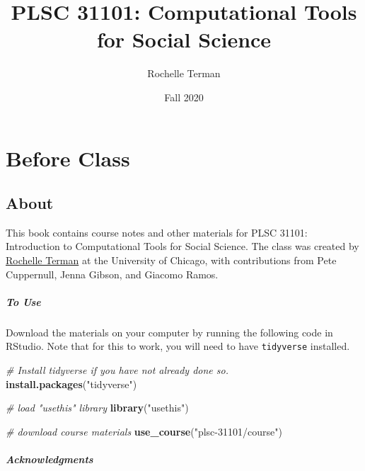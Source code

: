 \documentclass[
]{book}
\title{PLSC 31101: Computational Tools for Social Science}
\author{Rochelle Terman}
\date{Fall 2020}
\newenvironment{Shaded}{\begin{snugshade}}{\end{snugshade}}
\newcommand{\CommentTok}[1]{\textcolor[rgb]{0.56,0.35,0.01}{\textit{#1}}}
\newcommand{\KeywordTok}[1]{\textcolor[rgb]{0.13,0.29,0.53}{\textbf{#1}}}
\newcommand{\NormalTok}[1]{#1}
\newcommand{\StringTok}[1]{\textcolor[rgb]{0.31,0.60,0.02}{#1}}
\begin{document}
\maketitle

{
\setcounter{tocdepth}{1}
\tableofcontents
}
\hypertarget{part-before-class}{%
\part{Before Class}\label{part-before-class}}

\hypertarget{about}{%
\chapter{About}\label{about}}

This book contains course notes and other materials for PLSC 31101: Introduction to Computational Tools for Social Science. The class was created by \href{http://rochelleterman.com/}{Rochelle Terman} at the University of Chicago, with contributions from Pete Cuppernull, Jenna Gibson, and Giacomo Ramos.

\hypertarget{to-use}{%
\subsubsection*{To Use}\label{to-use}}

Download the materials on your computer by running the following code in RStudio. Note that for this to work, you will need to have \texttt{tidyverse} installed.

\begin{Shaded}
\begin{Highlighting}[]
\CommentTok{# Install tidyverse if you have not already done so.}
\KeywordTok{install.packages}\NormalTok{(}\StringTok{"tidyverse"}\NormalTok{)}

\CommentTok{# load "usethis" library}
\KeywordTok{library}\NormalTok{(}\StringTok{"usethis"}\NormalTok{)}

\CommentTok{# download course materials}
\KeywordTok{use_course}\NormalTok{(}\StringTok{"plsc-31101/course"}\NormalTok{)}
\end{Highlighting}
\end{Shaded}

\hypertarget{acknowledgments}{%
\subsubsection*{Acknowledgments}\label{acknowledgments}}
\end{document}
